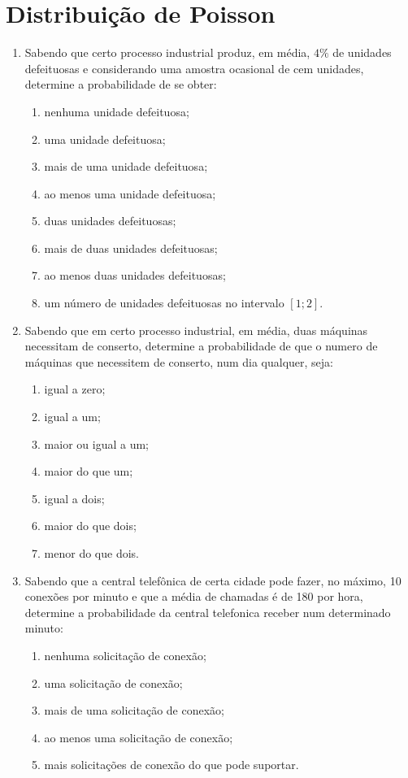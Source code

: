 \chapter{Distribuição de Poisson}  

\begin{enumerate}[resume]

\item Sabendo que certo processo industrial produz, em média, $4\%$ de unidades defeituosas e considerando uma amostra ocasional de cem unidades, determine a probabilidade de se obter:
	\begin{enumerate}
	\item nenhuma unidade defeituosa;
	\item uma unidade defeituosa;
	\item mais de uma unidade defeituosa;
	\item ao menos uma unidade defeituosa;
	\item duas unidades defeituosas;
	\item mais de duas unidades defeituosas;
	\item ao menos duas unidades defeituosas;
	\item um número de unidades defeituosas no intervalo $[1 ; 2]$.
	\end{enumerate}
	
\item Sabendo que em certo processo industrial, em média, duas máquinas necessitam de conserto, determine a probabilidade de que o numero de máquinas que necessitem de conserto, num dia qualquer, seja:
	\begin{enumerate}
	\item igual a zero;
	\item igual a um;
	\item maior ou igual a um;
	\item maior do que um;
	\item igual a dois;
	\item maior do que dois;
	\item menor do que dois.
	\end{enumerate}

\item Sabendo que a central telefônica de certa cidade pode fazer, no máximo, 10 conexões por minuto e que a média de chamadas é de 180 por hora, determine a probabilidade da central telefonica receber num determinado minuto:
	\begin{enumerate}
	\item nenhuma solicitação de conexão;
	\item uma solicitação de conexão;
	\item mais de uma solicitação de conexão;
	\item ao menos uma solicitação de conexão;
	\item mais solicitações de conexão do que pode suportar.
	\end{enumerate}


\end{enumerate}

